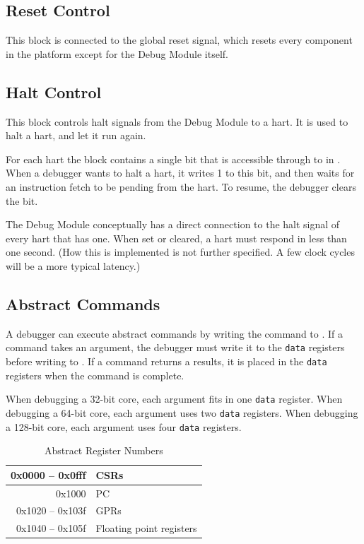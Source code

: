 \documentclass{article}
\begin{document}
\subsection{Reset Control} \label{reset}

This block is connected to the global reset signal, which resets every
component in the platform except for the Debug Module itself.

\subsection{Halt Control}

This block controls halt signals from the Debug Module to a hart.  It is used
to halt a hart, and let it run again.

For each hart the block contains a single bit that is accessible through to
\Fhalt in \Rdmcontrol. When a debugger wants to halt a hart, it writes 1 to
this bit, and then waits for an instruction fetch to be pending from the hart.
To resume, the debugger clears the bit.

The Debug Module conceptually has a direct connection to the halt signal of
every hart that has one. When set or cleared, a hart must respond in less than
one second.  (How this is implemented is not further specified. A few clock
cycles will be a more typical latency.)

\subsection{Abstract Commands}

A debugger can execute abstract commands by writing the command to \Rcommand.
If a command takes an argument, the debugger must write it to the {\tt data}
registers before writing to \Rcommand. If a command returns a results, it is
placed in the {\tt data} registers when the command is complete.

When debugging a 32-bit core, each argument fits in one {\tt data} register.
When debugging a 64-bit core, each argument uses two {\tt data} registers.
When debugging a 128-bit core, each argument uses four {\tt data} registers.

\begin{table}[htp]
    \centering
    \caption{Abstract Register Numbers}
    \label{tab:regno}
    \begin{tabulary}{\textwidth}{|r|l|}
        \hline
        0x0000 -- 0x0fff & CSRs \\
        \hline
        0x1000 & PC \\
        \hline
        0x1020 -- 0x103f & GPRs \\
        \hline
        0x1040 -- 0x105f & Floating point registers \\
        \hline
    \end{tabulary}
\end{table}
\end{document}
